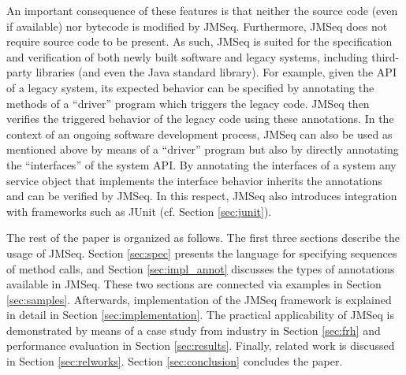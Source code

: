 An important consequence of these features
is that neither  the source code (even if available) nor bytecode is modified by JMSeq. 
Furthermore,  JMSeq does not require source code to be present.  
As such, JMSeq is suited for
the specification and verification of both
 newly built software and legacy systems, including third-party libraries
(and even the Java standard library).
For example, given  the API of a legacy system, its expected behavior  can be
specified by annotating the methods of a ``driver'' program which triggers
the legacy code.
JMSeq then verifies the triggered behavior of the legacy code using these
annotations.
%
 In the context of an ongoing software development process, JMSeq can also be used as mentioned above
by means of a ``driver'' program but also by directly
annotating the ``interfaces'' of the system API.
By annotating the  interfaces of a system any service object that implements the interface behavior inherits the annotations and can be verified by JMSeq.
In this  respect, JMSeq also introduces integration with frameworks such as JUnit (cf. Section \ref{sec:junit}). 



The rest of the paper is organized as follows.
The first three sections describe the usage of JMSeq.
Section \ref{sec:spec} presents the language for specifying sequences of method calls, 
and Section \ref{sec:impl_annot} discusses the types of annotations available in JMSeq.
These two sections are connected via examples in Section \ref{sec:samples}.
Afterwards, implementation of the JMSeq framework is explained in detail in Section \ref{sec:implementation}.
The practical applicability of JMSeq is demonstrated by means of a case study from industry in Section \ref{sec:frh} and performance evaluation in Section \ref{sec:results}. 
Finally, related work is discussed in Section \ref{sec:relworks}.
Section \ref{sec:conclusion} concludes the paper. %

